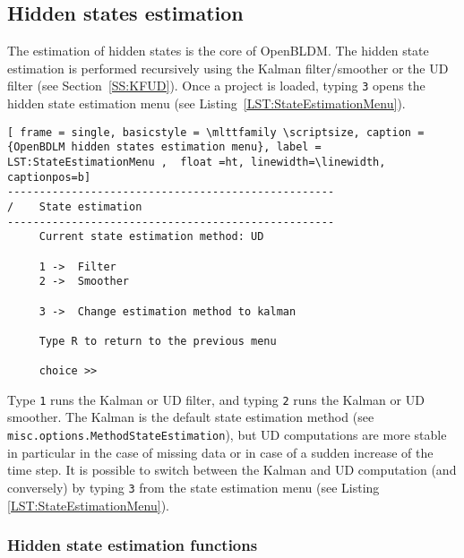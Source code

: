 \subsection{Hidden states estimation}
\label{S:HIDDENSTATESESTIMATION}

The estimation of hidden states is the core of OpenBLDM.
The hidden state estimation is performed recursively using the Kalman filter/smoother or the UD filter (see Section~\ref{SS:KFUD}).
Once a project is loaded, typing \colorbox{light-gray}{\lstinline[basicstyle = \mlttfamily \small ]!3!} opens the hidden state estimation menu (see Listing~\ref{LST:StateEstimationMenu}).

\begin{lstlisting}[ frame = single, basicstyle = \mlttfamily \scriptsize, caption = {OpenBDLM hidden states estimation menu}, label = LST:StateEstimationMenu ,  float =ht, linewidth=\linewidth, captionpos=b]
---------------------------------------------------
/    State estimation
---------------------------------------------------
     Current state estimation method: UD

     1 ->  Filter 
     2 ->  Smoother 

     3 ->  Change estimation method to kalman 

     Type R to return to the previous menu 

     choice >> 
\end{lstlisting}

Type  \colorbox{light-gray}{\lstinline[basicstyle = \mlttfamily \small ]!1!} runs the Kalman or UD filter, and typing \colorbox{light-gray}{\lstinline[basicstyle = \mlttfamily \small ]!2!} runs the Kalman or UD smoother.
The Kalman is the default state estimation method (see \lstinline[basicstyle = \mlttfamily \small ]!misc.options.MethodStateEstimation!), but UD computations are more stable in particular in the case of missing data or in case of a sudden increase of the time step.
It is possible to switch between the Kalman and UD computation (and conversely) by typing \colorbox{light-gray}{\lstinline[basicstyle = \mlttfamily \small ]!3!} from the state estimation menu (see Listing \ref{LST:StateEstimationMenu}).

\subsubsection{Hidden state estimation functions}

